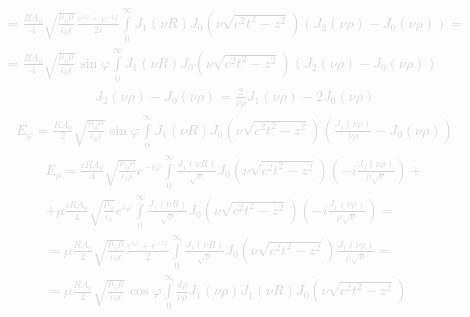 %
\textcolor{lightgray} { \begin{equation*} \begin{aligned}
= \frac{R A_0}{4} \sqrt{\frac{\mu_0 \mu}{\epsilon_0 \epsilon}} 
\frac{e^{i \varphi} - e^{-i \varphi} }{2i} \int \limits_{0}^{\infty} 
J_1 (\nu R) J_0 \left( \nu \sqrt{c^2 t^2 - z^2} \right) 
\left( J_2 (\nu \rho) - J_0 (\nu \rho) \right) = \\
= \frac{R A_0}{4} \sqrt{\frac{\mu_0 \mu}{\epsilon_0 \epsilon}} \sin \varphi 
\int \limits_{0}^{\infty} J_1 (\nu R) 
J_0 \left( \nu \sqrt{c^2 t^2 - z^2} \right) 
\left( J_2 (\nu \rho) - J_0 (\nu \rho) \right)
\end{aligned} \end{equation*} }
%
\textcolor{lightgray} { \begin{equation*} \begin{aligned}
J_2 (\nu \rho) - J_0 (\nu \rho) = \frac{2}{\nu \rho} J_1 (\nu \rho) - 
2 J_0 (\nu \rho)
\end{aligned} \end{equation*} }
%
\textcolor{lightgray} { \begin{equation*} \begin{aligned}
E_\varphi = \frac{R A_0}{2} \sqrt{\frac{\mu_0 \mu}{\epsilon_0 \epsilon}}
\sin \varphi \int \limits_{0}^{\infty} J_1 (\nu R) 
J_0 \left( \nu \sqrt{c^2 t^2 - z^2} \right) 
\left( \frac{J_1 (\nu \rho)}{\nu \rho} - J_0 (\nu \rho) \right)
\end{aligned} \end{equation*} }
%
\textcolor{lightgray} { \begin{equation*} \begin{aligned}
E_\rho = \frac{i R A_0}{4} \sqrt{\frac{\mu_0 \mu}{\epsilon_0 \epsilon}}  
e^{- i \varphi} \int \limits_{0}^{\infty} \frac{J_1 (\nu R)}{\sqrt{\nu}} 
J_0 \left( \nu \sqrt{c^2 t^2 - z^2} \right) 
\left( - i \frac{J_1 (\nu \rho)}{\rho \sqrt{\nu}} \right) + \\
+ \mu \frac{i R A_0}{4} \sqrt{\frac{\mu_0}{\epsilon_0}}  e^{i \varphi}
\int \limits_{0}^{\infty} \frac{J_1 (\nu R)}{\sqrt{\nu}}
J_0 \left( \nu \sqrt{c^2 t^2 - z^2} \right) 
\left( - i \frac{J_1 (\nu \rho)}{ \rho \sqrt{\nu}} \right) = \\
= \mu \frac{R A_0}{2} \sqrt{\frac{\mu_0 \mu}{\epsilon_0 \epsilon}} 
\frac{e^{i \varphi} + e^{-i \varphi}}{2}
\int \limits_{0}^{\infty} \frac{J_1 (\nu R)}{\sqrt{\nu}}
J_0 \left( \nu \sqrt{c^2 t^2 - z^2} \right) 
\frac{J_1 (\nu \rho)}{ \rho \sqrt{\nu}} = \\
= \mu \frac{R A_0}{2} \sqrt{\frac{\mu_0 \mu}{\epsilon_0 \epsilon}} 
\cos \varphi \int \limits_{0}^{\infty} \frac{d \rho}{\nu \rho} 
J_1 (\nu \rho) J_1 (\nu R) J_0 \left( \nu \sqrt{c^2 t^2 - z^2} \right)
\end{aligned} \end{equation*} }
